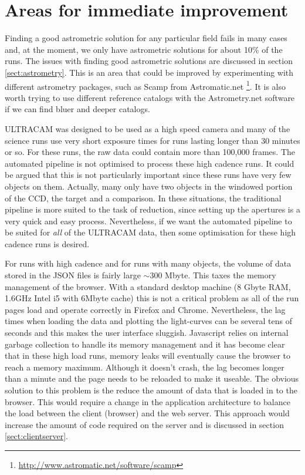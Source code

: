 \section{Areas for immediate improvement}
Finding a good astrometric solution for any particular field fails in many cases and, at the moment, we only have astrometric solutions for about 10\% of the runs. The issues with finding good astrometric solutions are discussed in section \ref{sect:astrometry}. This is an area that could be improved by experimenting with different astrometry packages, such as Scamp from Astromatic.net \footnote{\url{http://www.astromatic.net/software/scamp}}. It is also worth trying to use different reference catalogs with the Astrometry.net software if we can find bluer and deeper catalogs. 

ULTRACAM was designed to be used as a high speed camera and many of the science runs use very short exposure times for runs lasting longer than 30 minutes or so. For these runs,  the raw data could contain more than 100,000 frames. The automated pipeline is not optimised to process these high cadence runs. It could be argued that this is not particularly important since these runs have very few objects on them. Actually, many only have two objects in the windowed portion of the CCD, the target and a comparison. In these situations, the traditional pipeline is more suited to the task of reduction, since setting up the apertures is a very quick and easy process. Nevertheless, if we want the automated pipeline to be suited for \emph{all} of the ULTRACAM data, then some optimisation for these high cadence runs is desired. 

For runs with high cadence and for runs with many objects, the volume of data stored in the JSON files is fairly large $\sim 300$ Mbyte. This taxes the memory management of the browser. With a standard desktop machine (8 Gbyte RAM, 1.6GHz Intel i5 with 6Mbyte cache) this is not a critical problem as all of the run pages load and operate correctly in Firefox and Chrome. Nevertheless, the lag times when loading the data and plotting the light-curves can be several tens of seconds and this makes the user interface sluggish. Javascript relies on internal garbage collection to handle its memory management and it has become clear that in these high load runs, memory leaks will eventually cause the browser to reach a memory maximum. Although it doesn't crash, the lag becomes longer than a minute and the page needs to be reloaded to make it useable. The obvious solution to this problem is the reduce the amount of data that is loaded in to the browser. This would require a change in the application architecture to balance the load between the client (browser) and the web server. This approach would increase the amount of code required on the server and is discussed in section \ref{sect:clientserver}.  

